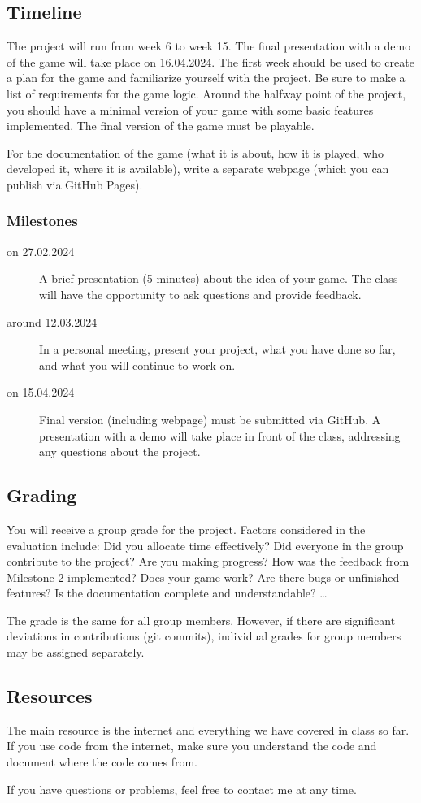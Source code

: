 \documentclass[11pt,a4paper]{report}
\begin{document}
\subsection{Timeline}

The project will run from week 6 to week 15. The final presentation with a demo of the game will take place on 16.04.2024. The first week should be used to create a plan for the game and familiarize yourself with the project. Be sure to make a list of requirements for the game logic. Around the halfway point of the project, you should have a minimal version of your game with some basic features implemented. The final version of the game must be playable.

For the documentation of the game (what it is about, how it is played, who developed it, where it is available), write a separate webpage (which you can publish via GitHub Pages).

\subsubsection{Milestones}
\begin{description}
    \item[on 27.02.2024] A brief presentation (5 minutes) about the idea of your game. The class will have the opportunity to ask questions and provide feedback.
\item[around 12.03.2024] In a personal meeting, present your project, what you have done so far, and what you will continue to work on.
    \item[on 15.04.2024] Final version (including webpage) must be submitted via GitHub. A presentation with a demo will take place in front of the class, addressing any questions about the project.
\end{description}

\subsection{Grading}

You will receive a group grade for the project. Factors considered in the evaluation include: Did you allocate time effectively? Did everyone in the group contribute to the project? Are you making progress? How was the feedback from Milestone 2 implemented? Does your game work? Are there bugs or unfinished features? Is the documentation complete and understandable? \dots

The grade is the same for all group members. However, if there are significant deviations in contributions (git commits), individual grades for group members may be assigned separately.

\newpage

\subsection{Resources}

The main resource is the internet and everything we have covered in class so far. If you use code from the internet, make sure you understand the code and document where the code comes from.

If you have questions or problems, feel free to contact me at any time.
\end{document}
